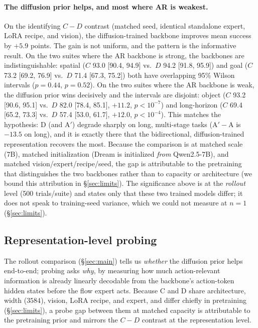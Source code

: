 \documentclass{article}
\begin{document}
\paragraph{The diffusion prior helps, and most where AR is weakest.} On the
identifying $C-D$ contrast (matched seed, identical standalone expert, LoRA
recipe, and vision), the diffusion-trained backbone improves mean success by
$+5.9$ points. The gain is not uniform, and the pattern is the informative result.
On the two suites where the AR backbone is strong, the backbones are
indistinguishable: spatial ($C$ 93.0 [90.4, 94.9] vs.\ $D$ 94.2 [91.8, 95.9]) and
goal ($C$ 73.2 [69.2, 76.9] vs.\ $D$ 71.4 [67.3, 75.2]) both have overlapping 95\%
Wilson intervals ($p=0.44$, $p=0.52$). On the two suites where the AR backbone is
weak, the diffusion prior wins decisively and the intervals are disjoint: object
($C$ 93.2 [90.6, 95.1] vs.\ $D$ 82.0 [78.4, 85.1], $+11.2$, $p<10^{-7}$) and
long-horizon ($C$ 69.4 [65.2, 73.3] vs.\ $D$ 57.4 [53.0, 61.7], $+12.0$,
$p<10^{-4}$). This matches the hypothesis: D (and A$'$) degrade sharply on long,
multi-stage tasks (A$'-$A is $-13.5$ on long), and it is exactly there that the
bidirectional, diffusion-trained representation recovers the most. Because the
comparison is at matched scale (7B), matched initialization (Dream is initialized
\emph{from} Qwen2.5-7B), and matched vision/expert/recipe/seed, the gap is
attributable to the pretraining that distinguishes the two backbones rather than to
capacity or architecture (we bound this attribution in \S\ref{sec:limits}). The
significance above is at the \emph{rollout} level (500 trials/suite) and states
only that these two trained models differ; it does not speak to training-seed
variance, which we could not measure at $n{=}1$ (\S\ref{sec:limits}).

\subsection{Representation-level probing}
\label{sec:probing}

The rollout comparison (\S\ref{sec:main}) tells us \emph{whether} the diffusion
prior helps end-to-end; probing asks \emph{why}, by measuring how much
action-relevant information is already linearly decodable from the backbone's
action-token hidden states before the flow expert acts. Because C and D share
architecture, width ($3584$), vision, LoRA recipe, and expert, and differ chiefly
in pretraining (\S\ref{sec:limits}), a probe gap between them at matched capacity
is attributable to the pretraining prior and mirrors the $C-D$ contrast at the
representation level.
\end{document}
